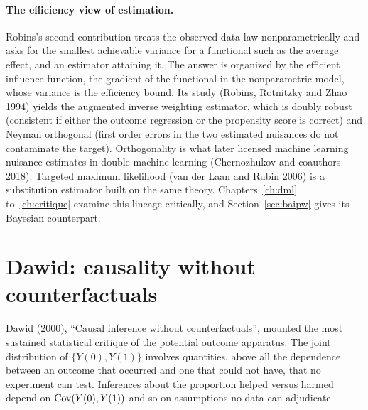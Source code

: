 \paragraph{The efficiency view of estimation.} Robins's second contribution treats the observed data law nonparametrically and asks for the smallest achievable variance for a functional such as the average effect, and an estimator attaining it. The answer is organized by the efficient influence function, the gradient of the functional in the nonparametric model, whose variance is the efficiency bound. Its study (Robins, Rotnitzky and Zhao 1994) yields the augmented inverse weighting estimator, which is doubly robust (consistent if either the outcome regression or the propensity score is correct) and Neyman orthogonal (first order errors in the two estimated nuisances do not contaminate the target). Orthogonality is what later licensed machine learning nuisance estimates in double machine learning (Chernozhukov and coauthors 2018). Targeted maximum likelihood (van der Laan and Rubin 2006) is a substitution estimator built on the same theory. Chapters~\ref{ch:dml} to~\ref{ch:critique} examine this lineage critically, and Section~\ref{sec:baipw} gives its Bayesian counterpart.

\section{Dawid: causality without counterfactuals}\label{fw:sec:dawid}

Dawid (2000), ``Causal inference without counterfactuals'', mounted the most sustained statistical critique of the potential outcome apparatus. The joint distribution of $\{Y(0), Y(1)\}$ involves quantities, above all the dependence between an outcome that occurred and one that could not have, that no experiment can test. Inferences about the proportion helped versus harmed depend on $\mathrm{Cov}(Y(0),Y(1))$ and so on assumptions no data can adjudicate.

